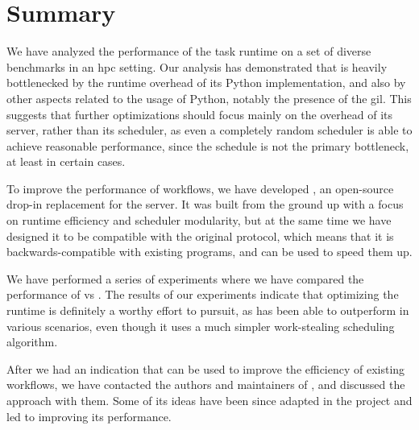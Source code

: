 \section*{Summary}
We have analyzed the performance of the \dask{} task runtime on a set of
diverse benchmarks in an \gls{hpc} setting. Our analysis has demonstrated that
\dask{} is heavily bottlenecked by the runtime overhead of its Python
implementation, and also by other aspects related to the usage of Python, notably the presence of
the \gls{gil}. This suggests that further optimizations should focus mainly on
the overhead of its server, rather than its scheduler, as even a completely random scheduler is
able to achieve reasonable performance, since the schedule is not the primary bottleneck, at
least in certain cases.

To improve the performance of \dask{} workflows, we have developed
\rsds{}, an open-source drop-in replacement for the \dask{}
server. It was built from the ground up with a focus on runtime efficiency and scheduler
modularity, but at the same time we have designed it to be compatible with the original
\dask{} protocol, which means that it is backwards-compatible with existing
\dask{} programs, and can be used to speed them up.

We have performed a series of experiments where we have compared the performance of
\rsds{} vs \dask{}. The results of our experiments indicate
that optimizing the runtime is definitely a worthy effort to pursuit, as
\rsds{} has been able to outperform \dask{} in various
scenarios, even though it uses a much simpler work-stealing scheduling algorithm.

After we had an indication that \rsds{} can be used to improve the efficiency
of existing \dask{} workflows, we have contacted the authors and maintainers of
\dask{}, and discussed the \rsds{} approach with
them. Some of its
ideas have been since adapted in the \dask{} project and led to improving its
performance.
